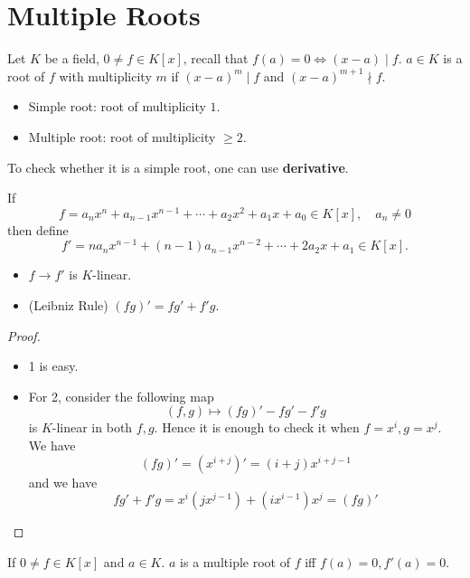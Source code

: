 \section{Multiple Roots}

\begin{definition}
	Let \( K \) be a field, \( 0\ne f \in K[x] \), recall that \( f(a) = 0\iff (x-a) \mid f \). \( a
	\in K \) is a root of \( f \) with multiplicity \( m \) if \( (x-a)^m \mid f \) and \( (x-a)^{m+1} \nmid f \).
	\begin{itemize}
		\item Simple root: root of multiplicity \( 1 \).
		\item Multiple root: root of multiplicity \( \ge 2 \).
	\end{itemize}
\end{definition}
To check whether it is a simple root, one can use \textbf{derivative}.

\begin{definition}
	If
	\[
		f = a_n x^n + a_{n-1} x^{n-1} + \cdots + a_2 x^2 + a_1 x + a_0 \in K[x], \quad a_n \ne 0
	\]
	then define
	\[
		f' = n a_n x^{n-1} + (n-1) a_{n-1} x^{n-2} + \cdots + 2 a_2 x + a_1 \in K[x].
	\]
\end{definition}

\begin{remark}
	\leavevmode
	\begin{itemize}
		\item \( f \to f' \) is \( K \)-linear.
		\item (Leibniz Rule) \( (fg)' = fg' + f'g \).
	\end{itemize}
\end{remark}

\begin{proof}
	\leavevmode
	\begin{itemize}
		\item 1 is easy.
		\item For 2, consider the following map
		      \[
			      (f,g) \mapsto (fg)' - fg' - f'g
		      \]
		      is \( K \)-linear in both \( f,g \). Hence it is enough to check it when \( f = x^i,g=x^j \).
		      We have
		      \[
			      (fg)' = (x^{i+j})' = (i+j)x^{i+j-1}
		      \]
		      and we have
		      \[
			      fg' + f'g = x^i (jx^{j-1}) + (ix^{i-1})x^j = (fg)'
		      \]
	\end{itemize}
\end{proof}

\begin{proposition}
	If \( 0 \ne f \in K[x] \) and \( a \in K \). \( a \) is a multiple root of \( f \) iff \( f(a) =
	0, f'(a) = 0 \).
\end{proposition}

